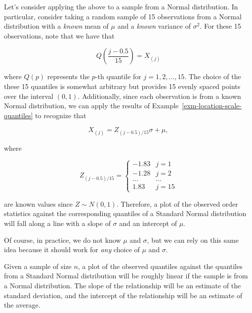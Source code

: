 \documentclass[
  letterpaper,
  DIV=11,
  numbers=noendperiod]{scrreprt}
\theoremstyle{plain}
\theoremstyle{definition}
\theoremstyle{definition}
\theoremstyle{remark}
\begin{document}
Let's consider applying the above to a sample from a Normal
distribution. In particular, consider taking a random sample of 15
observations from a Normal distribution with a \emph{known} mean of
\(\mu\) and a \emph{known} variance of \(\sigma^2\). For these 15
observations, note that we have that

\[Q\left(\frac{j - 0.5}{15}\right) = X_{(j)}\]

where \(Q(p)\) represents the \(p\)-th quantile for
\(j = 1,2,\dotsc, 15\). The choice of the these 15 quantiles is somewhat
arbitrary but provides 15 evenly spaced points over the interval
\((0, 1)\). Additionally, since each observation is from a known Normal
distribution, we can apply the results of
Example~\ref{exm-location-scale-quantiles} to recognize that

\[X_{(j)} = Z_{(j - 0.5)/15} \sigma + \mu,\]

where

\[Z_{(j - 0.5)/15} = \begin{cases} -1.83 & j = 1 \\ -1.28 & j = 2 \\ \dotsc & \dotsc \\ 1.83 & j = 15\end{cases}\]

are known values since \(Z \sim N(0, 1)\). Therefore, a plot of the
observed order statistics against the corresponding quantiles of a
Standard Normal distribution will fall along a line with a slope of
\(\sigma\) and an intercept of \(\mu\).

Of course, in practice, we do not know \(\mu\) and \(\sigma\), but we
can rely on this same idea because it should work for \emph{any} choice
of \(\mu\) and \(\sigma\).

\begin{tcolorbox}[enhanced jigsaw, toprule=.15mm, left=2mm, title=\textcolor{quarto-callout-note-color}{\faInfo}\hspace{0.5em}{Assessing Normality}, opacityback=0, toptitle=1mm, leftrule=.75mm, colbacktitle=quarto-callout-note-color!10!white, opacitybacktitle=0.6, titlerule=0mm, breakable, colframe=quarto-callout-note-color-frame, arc=.35mm, coltitle=black, bottomtitle=1mm, rightrule=.15mm, colback=white, bottomrule=.15mm]

Given a sample of size \(n\), a plot of the observed quantiles against
the quantiles from a Standard Normal distribution will be roughly linear
if the sample is from a Normal distribution. The slope of the
relationship will be an estimate of the standard deviation, and the
intercept of the relationship will be an estimate of the average.

\end{tcolorbox}
\end{document}
